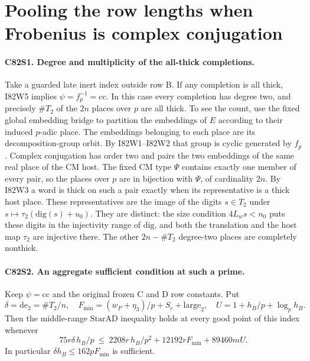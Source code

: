 \section{Pooling the row lengths when Frobenius is complex conjugation}

\paragraph{C82S1. Degree and multiplicity of the all-thick completions.}
Take a guarded late inert index outside row B. If any completion
is all thick, I82W5 implies $\psi=f_p^{-1}=\mathrm{cc}$.
In this case every completion has degree two, and precisely
$\#T_2$ of the $2n$ places over $p$ are all thick. To see the
count, use the fixed global embedding bridge to partition the
embeddings of $E$ according to their induced $p$-adic place.
The embeddings belonging to each place are its decomposition-group
orbit. By I82W1--I82W2 that group is cyclic generated by $f_p$.
Complex conjugation has order two and pairs the two embeddings
of the same real place of the CM host. The fixed CM type $\Psi$
contains exactly one member of every pair, so the places over
$p$ are in bijection with $\Psi$, of cardinality $2n$.
By I82W3 a word is thick on such a pair exactly when its
representative is a thick host place. These representatives
are the image of the digits $s\in T_2$ under
$s\mapsto\tau_2(\mathrm{dig}(s)+u_0)$. They are distinct:
the size condition $4L_ws<n_0$ puts these digits in the
injectivity range of $\mathrm{dig}$, and both the translation
and the host map $\tau_2$ are injective there. The other
$2n-\#T_2$ degree-two places are completely nonthick.

\paragraph{C82S2. An aggregate sufficient condition at such a prime.}
Keep $\psi=\mathrm{cc}$ and the original frozen C and D row
constants. Put
\[
 \delta=\mathrm{de}_2=\#T_2/n,\quad
 F_{\min}=(w_P+\eta_3)/p+S_c+\mathrm{large}_2,\quad
 U=1+h_B/p+\log_p h_B.
\]
Then the middle-range $\mathrm{StarAD}$ inequality holds at
every good point of this index whenever
\[
 75r\delta\,h_B/p
 \ \le\ 2208r\,h_B/p^2+12192r F_{\min}+89460m U .
\]
In particular $\delta h_B\le162p F_{\min}$ is sufficient.

